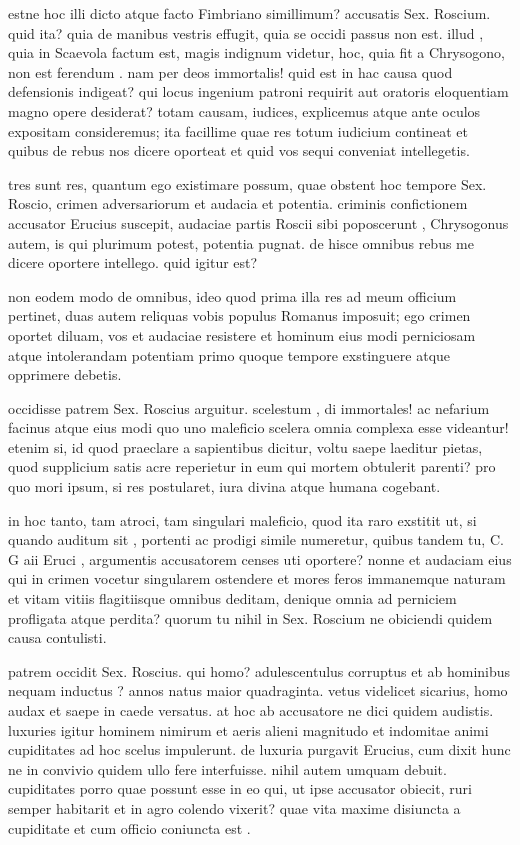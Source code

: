  estne hoc illi dicto atque facto Fimbriano simillimum? accusatis Sex. Roscium. quid ita? quia de manibus vestris effugit, quia se occidi passus non est. illud , quia in Scaevola factum est, magis indignum videtur, hoc, quia fit a Chrysogono, non est ferendum . nam per deos immortalis! quid est in hac causa quod defensionis indigeat? qui locus ingenium patroni requirit aut oratoris eloquentiam magno opere desiderat? totam causam, iudices, explicemus atque ante oculos expositam consideremus; ita facillime quae res totum iudicium contineat et quibus de rebus nos dicere oporteat et quid vos sequi conveniat intellegetis.

 tres sunt res, quantum ego existimare possum, quae obstent hoc tempore Sex. Roscio, crimen adversariorum et audacia et potentia. criminis confictionem accusator Erucius suscepit, audaciae partis Roscii sibi poposcerunt , Chrysogonus autem, is qui plurimum potest, potentia pugnat. de hisce omnibus rebus me dicere oportere intellego. quid igitur est?

 non eodem modo de omnibus, ideo quod prima illa res ad meum officium pertinet, duas autem reliquas vobis populus Romanus imposuit; ego crimen oportet diluam, vos et audaciae resistere et hominum eius modi perniciosam atque intolerandam potentiam primo quoque tempore exstinguere atque opprimere debetis.

 occidisse patrem Sex. Roscius arguitur. scelestum , di immortales! ac nefarium facinus atque eius modi quo uno maleficio scelera omnia complexa esse videantur! etenim si, id quod praeclare a sapientibus dicitur, voltu saepe laeditur pietas, quod supplicium satis acre reperietur in eum qui mortem obtulerit parenti? pro quo mori ipsum, si res postularet, iura divina atque humana cogebant.

 in hoc tanto, tam atroci, tam singulari maleficio, quod ita raro exstitit ut, si quando auditum sit , portenti ac prodigi simile numeretur, quibus tandem tu, C. G aii Eruci , argumentis accusatorem censes uti oportere? nonne et audaciam eius qui in crimen vocetur singularem ostendere et mores feros immanemque naturam et vitam vitiis flagitiisque omnibus deditam, denique omnia ad perniciem profligata atque perdita? quorum tu nihil in Sex. Roscium ne obiciendi quidem causa contulisti.

 patrem occidit Sex. Roscius. qui homo? adulescentulus corruptus et ab hominibus nequam inductus ? annos natus maior quadraginta. vetus videlicet sicarius, homo audax et saepe in caede versatus. at hoc ab accusatore ne dici quidem audistis. luxuries igitur hominem nimirum et aeris alieni magnitudo et indomitae animi cupiditates ad hoc scelus impulerunt. de luxuria purgavit Erucius, cum dixit hunc ne in convivio quidem ullo fere interfuisse. nihil autem umquam debuit. cupiditates porro quae possunt esse in eo qui, ut ipse accusator obiecit, ruri semper habitarit et in agro colendo vixerit? quae vita maxime disiuncta a cupiditate et cum officio coniuncta est .

